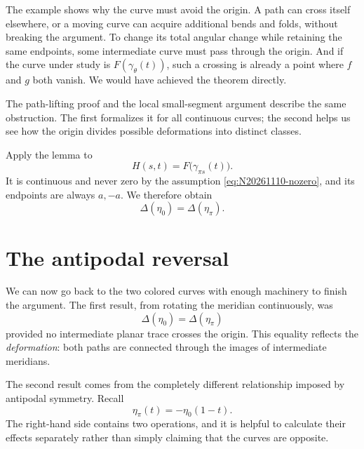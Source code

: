The example shows why the curve must avoid the origin. A path can cross itself elsewhere, or a moving curve can acquire additional bends and folds, without breaking the argument. To change its total angular change while retaining the same endpoints, some intermediate curve must pass through the origin. And if the curve under study is \(F(\gamma_\theta(t))\), such a crossing is already a point where \(f\) and \(g\) both vanish. We would have achieved the theorem directly.

The path-lifting proof and the local small-segment argument describe the same obstruction. The first formalizes it for all continuous curves; the second helps us see how the origin divides possible deformations into distinct classes.

Apply the lemma to
\[
 H(s,t)=F\bigl(\gamma_{\pi s}(t)\bigr).
\]
It is continuous and never zero by the assumption \eqref{eq:N20261110-nozero}, and its endpoints are always $a,-a$. We therefore obtain
\begin{equation}
 \boxed{\Delta(\eta_0)=\Delta(\eta_\pi).}
 \label{eq:N20261110-homotopy-equal}
\end{equation}

\section{The antipodal reversal}

We can now go back to the two colored curves with enough machinery to finish the argument. The first result, from rotating the meridian continuously, was
\[
 \Delta(\eta_0)=\Delta(\eta_\pi)
\]
provided no intermediate planar trace crosses the origin. This equality reflects the \emph{deformation}: both paths are connected through the images of intermediate meridians.

The second result comes from the completely different relationship imposed by antipodal symmetry. Recall
\[
 \eta_\pi(t)=-\eta_0(1-t).
\]
The right-hand side contains two operations, and it is helpful to calculate their effects separately rather than simply claiming that the curves are opposite.

